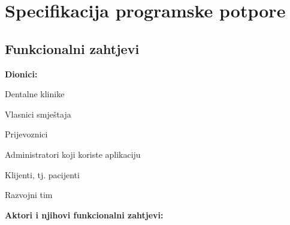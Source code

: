 \chapter{Specifikacija programske potpore}
		
	\section{Funkcionalni zahtjevi}
			
			
			\noindent \textbf{Dionici:}
			
			\begin{packed_enum}
				
				\item Dentalne klinike
				\item Vlasnici smještaja			
				\item Prijevoznici
				\item Administratori koji koriste aplikaciju
				\item Klijenti, tj. pacijenti
				\item Razvojni tim
				
				
			\end{packed_enum}
			
			\noindent \textbf{Aktori i njihovi funkcionalni zahtjevi:}
			

